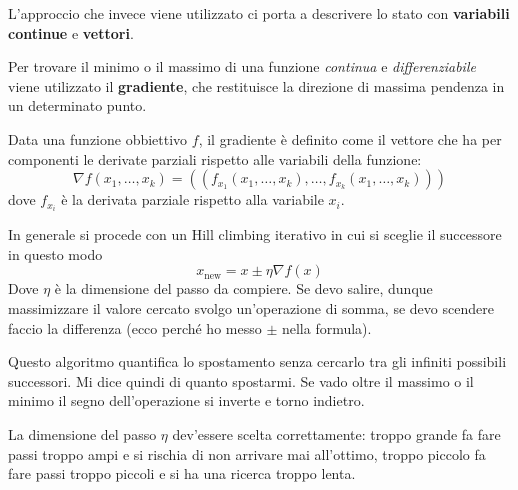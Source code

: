 L'approccio che invece viene utilizzato ci porta a descrivere lo stato con \textbf{variabili continue} e \textbf{vettori}.

Per trovare il minimo o il massimo di una funzione \emph{continua} e \emph{differenziabile} viene utilizzato il \textbf{gradiente},
che restituisce la direzione di massima pendenza in un determinato punto.

\begin{definition}
	Data una funzione obbiettivo $f$, il gradiente \`e definito come il vettore che ha per componenti le derivate parziali rispetto alle
	variabili della funzione:
	\[ \nabla f(x_1, \dots, x_k) = ((f_{x_1}(x_1, \dots, x_k), \dots, f_{x_k}(x_1, \dots, x_k))) \]
	dove $f_{x_i}$ \`e la derivata parziale rispetto alla variabile $x_i$.
\end{definition}

In generale si procede con un Hill climbing iterativo in cui si sceglie il successore in questo modo
\[ x_{\text{new}} = x \pm \eta \nabla f (x) \]
Dove $\eta$ \`e la dimensione del passo da compiere. Se devo salire, dunque massimizzare il valore cercato svolgo un'operazione di somma,
se devo scendere faccio la differenza (ecco perch\'e ho messo $\pm$ nella formula).

Questo algoritmo quantifica lo spostamento senza cercarlo tra gli infiniti possibili successori. Mi dice quindi di quanto spostarmi.
Se vado oltre il massimo o il minimo il segno dell'operazione si inverte e torno indietro.

La dimensione del passo $\eta$ dev'essere scelta correttamente: troppo grande fa fare passi troppo ampi e si rischia di non arrivare mai all'ottimo,
troppo piccolo fa fare passi troppo piccoli e si ha una ricerca troppo lenta.
